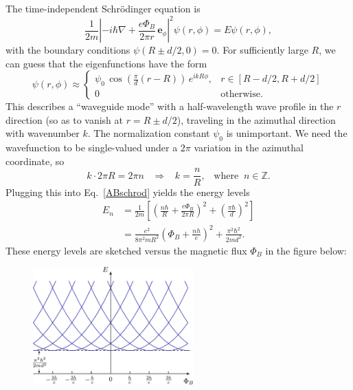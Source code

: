 \documentclass[prx,12pt]{revtex4-2}
\begin{document}
The time-independent Schr\"odinger equation is
\begin{equation}
  \frac{1}{2m}\left|-i\hbar\nabla+
  \frac{e\Phi_B}{2\pi r} \, \mathbf{e}_\phi\right|^2 \psi(r,\phi)
  = E\psi(r,\phi),
  \label{ABschrod}
\end{equation}
with the boundary conditions $\psi(R\pm d/2,0) = 0$.  For sufficiently
large $R$, we can guess that the eigenfunctions have the form
\begin{equation}
  \psi(r,\phi) \approx
  \begin{cases}
  \psi_0 \, \cos\left(\frac{\pi}{d}(r-R)\right)\, e^{i k R \phi},
  & r \in [R-d/2, R + d/2] \\
  0 & \textrm{otherwise}.
  \end{cases}
\end{equation}
This describes a ``waveguide mode'' with a half-wavelength wave
profile in the $r$ direction (so as to vanish at $r = R \pm d/2$),
traveling in the azimuthal direction with wavenumber $k$.  The
normalization constant $\psi_0$ is unimportant.  We need the
wavefunction to be single-valued under a $2\pi$ variation in the
azimuthal coordinate, so
\begin{equation}
  k \cdot 2\pi R = 2\pi n \;\;\;\Rightarrow \;\;\; k = \frac{n}{R},
  \;\;\;\mathrm{where}\;\; n \in \mathbb{Z}.
\end{equation}
Plugging this into Eq.~\eqref{ABschrod} yields the energy levels
\begin{align}
  E_n &= \frac{1}{2m} \left[
    \left(\frac{n\hbar}{R} + \frac{e\Phi_B}{2\pi R}\right)^2
    + \left(\frac{\pi\hbar}{d}\right)^2 \right] \\
  &= \frac{e^2}{8\pi^2mR^2} \left(\Phi_B + \frac{nh}{e} \right)^2
  + \frac{\pi^2\hbar^2}{2md^2}.
  \label{abcurves}
\end{align}
These energy levels are sketched versus the magnetic flux $\Phi_B$ in
the figure below:

\begin{figure}[h]
  \centering\includegraphics[width=0.55\textwidth]{abring}
\end{figure}
\end{document}
